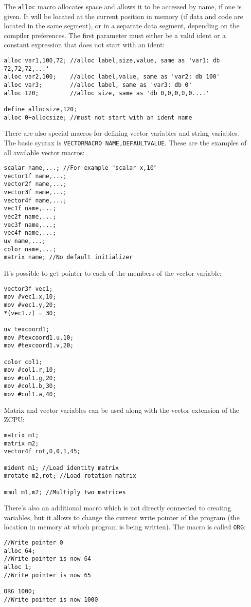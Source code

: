 The \texttt{alloc} macro allocates space and allows it to be accessed by name, if one is given. It will be located at the current position in memory (if data and code are located in the same segment), or in a separate data segment, depending on the compiler preferences. The first parameter must either be a valid ident or a constant expression that does not start with an ident:
\begin{verbatim}
alloc var1,100,72; //alloc label,size,value, same as 'var1: db 72,72,72,...'
alloc var2,100;    //alloc label,value, same as 'var2: db 100'
alloc var3;        //alloc label, same as 'var3: db 0'
alloc 120;         //alloc size, same as 'db 0,0,0,0,0....'

define allocsize,120;
alloc 0+allocsize; //must not start with an ident name
\end{verbatim}

There are also special macros for defining vector variables and string variables. The basic syntax is \texttt{VECTOR\textunderscore MACRO NAME,DEFAULT\textunderscore VALUE}. These are the examples of all available vector macros:
\begin{verbatim}
scalar name,...; //For example "scalar x,10"
vector1f name,...;
vector2f name,...;
vector3f name,...;
vector4f name,...;
vec1f name,...;
vec2f name,...;
vec3f name,...;
vec4f name,...;
uv name,...; 
color name,...; 
matrix name; //No default initializer
\end{verbatim}

It's possible to get pointer to each of the members of the vector variable:
\begin{verbatim}
vector3f vec1;
mov #vec1.x,10;
mov #vec1.y,20;
*(vec1.z) = 30;

uv texcoord1;
mov #texcoord1.u,10;
mov #texcoord1.v,20;

color col1;
mov #col1.r,10;
mov #col1.g,20;
mov #col1.b,30;
mov #col1.a,40;
\end{verbatim}

Matrix and vector variables can be used along with the vector extension of the ZCPU:
\begin{verbatim}
matrix m1;
matrix m2;
vector4f rot,0,0,1,45;

mident m1; //Load identity matrix
mrotate m2,rot; //Load rotation matrix

mmul m1,m2; //Multiply two matrices
\end{verbatim}

There's also an additional macro which is not directly connected to creating variables, but it allows to change the current write pointer of the program (the location in memory at which program is being written). The macro is called \texttt{ORG}:
\begin{verbatim}
//Write pointer 0
alloc 64;
//Write pointer is now 64
alloc 1;
//Write pointer is now 65

ORG 1000;
//Write pointer is now 1000
\end{verbatim}

